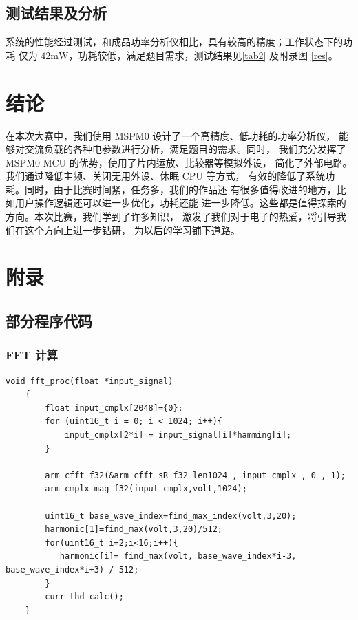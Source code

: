 \documentclass[a4paper,12pt,UTF8]{article}
\begin{document}
\subsection{测试结果及分析}
系统的性能经过测试，和成品功率分析仪相比，具有较高的精度；工作状态下的功耗
仅为 $42\mathrm{mW}$，功耗较低，满足题目需求，测试结果见\autoref{tab2} 及附录图 \ref{res}。

\section{结论}
在本次大赛中，我们使用 MSPM0 设计了一个高精度、低功耗的功率分析仪，
能够对交流负载的各种电参数进行分析，满足题目的需求。同时，
我们充分发挥了 MSPM0 MCU 的优势，使用了片内运放、比较器等模拟外设，
简化了外部电路。我们通过降低主频、关闭无用外设、休眠 CPU 等方式，
有效的降低了系统功耗。同时，由于比赛时间紧，任务多，我们的作品还
有很多值得改进的地方，比如用户操作逻辑还可以进一步优化，功耗还能
进一步降低。这些都是值得探索的方向。本次比赛，我们学到了许多知识，
激发了我们对于电子的热爱，将引导我们在这个方向上进一步钻研，
为以后的学习铺下道路。

{} 


\newpage

\appendix
\section{附录}
\subsection{部分程序代码}
\subsubsection{FFT 计算}
\begin{lstlisting}[style=Cstyle]
    void fft_proc(float *input_signal)
    {
        float input_cmplx[2048]={0};
        for (uint16_t i = 0; i < 1024; i++){
            input_cmplx[2*i] = input_signal[i]*hamming[i];
        }

        arm_cfft_f32(&arm_cfft_sR_f32_len1024 , input_cmplx , 0 , 1);
        arm_cmplx_mag_f32(input_cmplx,volt,1024);

        uint16_t base_wave_index=find_max_index(volt,3,20);
        harmonic[1]=find_max(volt,3,20)/512;
        for(uint16_t i=2;i<16;i++){
           harmonic[i]= find_max(volt, base_wave_index*i-3, base_wave_index*i+3) / 512;
        }
        curr_thd_calc();
    }
\end{lstlisting}
\end{document}
